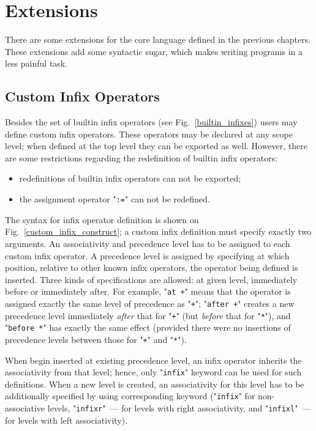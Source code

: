 \chapter{Extensions}
\label{sec:extensions}

There are some extensions for the core language defined in the previous chapters. These
extensions add some syntactic sugar, which makes writing programs in \lama a less
painful task.

\section{Custom Infix Operators}
\label{sec:custom_infix}

Besides the set of builtin infix operators (see Fig.~\ref{builtin_infixes}) users may define
custom infix operators. These operators may be declared at any scope level; when defined
at the top level they can be exported as well. However, there are some restrictions regarding the
redefinition of builtin infix operators:

\begin{itemize}
\item redefinitions of builtin infix operators can not be exported;
\item the assignment operator "\lstinline|:=|" can not be redefined.
\end{itemize}

The syntax for infix operator definition is shown on Fig.~\ref{custom_infix_construct}; a custom infix definition must specify exactly two arguments.
An associativity and precedence level has to be assigned to each custom infix operator. A precedence level is assigned by specifying at which
position, relative to other known infix operators, the operator being defined is inserted. Three kinds of specifications are allowed: at given level,
immediately before or immediately after. For example, "\lstinline|at +|" means that the operator is assigned exactly the same
level of precedence as "\lstinline|+|"; "\lstinline|after +|" creates a new precedence level immediately \emph{after} that for
"\lstinline|+|" (but \emph{before} that for "\lstinline|*|"), and "\lstinline|before *|" has exactly the same effect (provided
there were no insertions of precedence levels between those for "\lstinline|+|" and "\lstinline|*|").

When begin inserted at existing precedence level, an infix operator inherits the associativity from that level; hence, only "\lstinline|infix|"
keyword can be used for such definitions. When a new level is created, an associativity for this level has to be additionally specified
by using corresponding keyword ("\lstinline|infix|" for non-associative levels, "\lstinline|infixr|"~--- for levels with right
associativity, and "\lstinline|infixl|"~--- for levels with left associativity).

